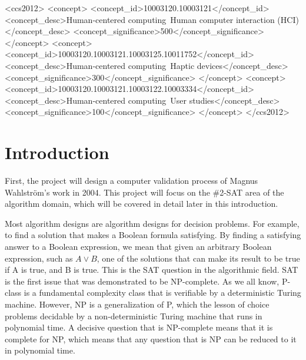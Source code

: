 \documentclass{sigchi}
\def\plainkeywords{\#SAT; \#2SAT; graph theory; complexity theory}
\begin{document}

\begin{CCSXML}
<ccs2012>
<concept>
<concept_id>10003120.10003121</concept_id>
<concept_desc>Human-centered computing~Human computer interaction (HCI)</concept_desc>
<concept_significance>500</concept_significance>
</concept>
<concept>
<concept_id>10003120.10003121.10003125.10011752</concept_id>
<concept_desc>Human-centered computing~Haptic devices</concept_desc>
<concept_significance>300</concept_significance>
</concept>
<concept>
<concept_id>10003120.10003121.10003122.10003334</concept_id>
<concept_desc>Human-centered computing~User studies</concept_desc>
<concept_significance>100</concept_significance>
</concept>
</ccs2012>
\end{CCSXML}


\keywords{\plainkeywords}





\section{Introduction}
First, the project will design a computer validation process of Magnus Wahlström's work in 2004.\cite{10.1016/j.tcs.2004.10.037} This project will focus on the \#2-SAT area of the algorithm domain, which will be covered in detail later in this introduction.

Most algorithm designs are algorithm designs for decision problems. For example, to find a solution that makes a Boolean formula satisfying. By finding a satisfying answer to a Boolean expression, we mean that given an arbitrary Boolean expression, such as $A \vee B $, one of the solutions that can make its result to be true if A is true, and B is true. This is the SAT question in the algorithmic field. SAT is the first issue that was demonstrated to be NP-complete.\cite{10.1145/800157.805047} As we all know, P-class is a fundamental complexity class that is verifiable by a deterministic Turing machine.\cite{10.1007/978-3-7643-8827-0_3} However, NP is a generalization of P, which the lesson of choice problems decidable by a non-deterministic Turing machine that runs in polynomial time. A decisive question that is NP-complete means that it is complete for NP, which means that any question that is NP can be reduced to it in polynomial time.\cite{10.1063/1.5120591}
\end{document}
